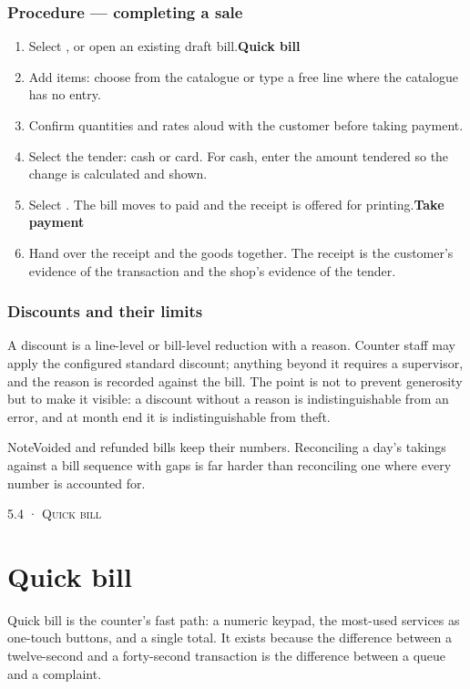 \documentclass[11pt,a4paper,oneside]{book}
\begin{document}
\subsubsection*{Procedure — completing a sale}
\begin{enumerate}
\item Select , or open an existing draft bill.\textbf{Quick bill}
\item Add items: choose from the catalogue or type a free line where the catalogue has no entry.
\item Confirm quantities and rates aloud with the customer before taking payment.
\item Select the tender: cash or card. For cash, enter the amount tendered so the change is calculated and shown.
\item Select . The bill moves to paid and the receipt is offered for printing.\textbf{Take payment}
\item Hand over the receipt and the goods together. The receipt is the customer's evidence of the transaction and the shop's evidence of the tender.
\end{enumerate}
\subsubsection*{Discounts and their limits}
A discount is a line-level or bill-level reduction with a reason. Counter staff may apply the configured standard discount; anything beyond it requires a supervisor, and the reason is recorded against the bill. The point is not to prevent generosity but to make it visible: a discount without a reason is indistinguishable from an error, and at month end it is indistinguishable from theft.

\begin{notebox}NoteVoided and refunded bills keep their numbers. Reconciling a day's takings against a bill sequence with gaps is far harder than reconciling one where every number is accounted for.\end{notebox}
\textsc{\small\color{crimson}5.4 · Quick bill}\par\medskip
\section*{Quick bill}
Quick bill is the counter's fast path: a numeric keypad, the most-used services as one-touch buttons, and a single total. It exists because the difference between a twelve-second and a forty-second transaction is the difference between a queue and a complaint.
\end{document}
